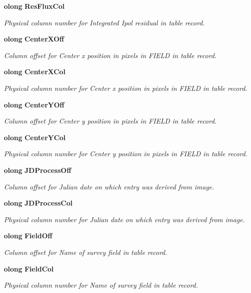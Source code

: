 \begin{CompactItemize}
{\bf olong} {\bf Res\-Flux\-Col}
\begin{CompactList}\small\item\em Physical column number for Integrated Ipol residual in table record. \item\end{CompactList}\item 
{\bf olong} {\bf Center\-XOff}
\begin{CompactList}\small\item\em Column offset for Center x position in pixels in FIELD in table record. \item\end{CompactList}\item 
{\bf olong} {\bf Center\-XCol}
\begin{CompactList}\small\item\em Physical column number for Center x position in pixels in FIELD in table record. \item\end{CompactList}\item 
{\bf olong} {\bf Center\-YOff}
\begin{CompactList}\small\item\em Column offset for Center y position in pixels in FIELD in table record. \item\end{CompactList}\item 
{\bf olong} {\bf Center\-YCol}
\begin{CompactList}\small\item\em Physical column number for Center y position in pixels in FIELD in table record. \item\end{CompactList}\item 
{\bf olong} {\bf JDProcess\-Off}
\begin{CompactList}\small\item\em Column offset for Julian date on which entry was derived from image. \item\end{CompactList}\item 
{\bf olong} {\bf JDProcess\-Col}
\begin{CompactList}\small\item\em Physical column number for Julian date on which entry was derived from image. \item\end{CompactList}\item 
{\bf olong} {\bf Field\-Off}
\begin{CompactList}\small\item\em Column offset for Name of survey field in table record. \item\end{CompactList}\item 
{\bf olong} {\bf Field\-Col}
\begin{CompactList}\small\item\em Physical column number for Name of survey field in table record. \item\end{CompactList}\end{CompactItemize}


